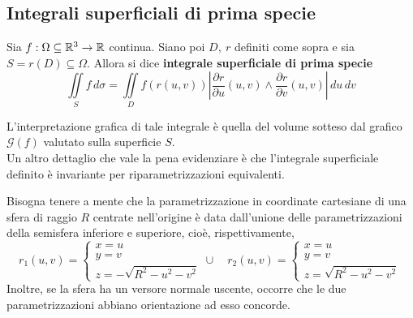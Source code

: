 \subsection{Integrali superficiali di prima specie}
 \begin{definition} \label{Def: Integrale superficiale di prima specie}
     Sia $f: \Omega \subseteq \mathbb{R}^3 \to \mathbb{R}$ continua. Siano poi $D,\ r$ definiti come sopra e sia $S=r(D) \subseteq \Omega$. Allora si dice \textbf{integrale superficiale di prima specie}
     \begin{equation}
         \iint\limits_{S}{f}\, d\sigma = \iint\limits_{D}{f(r(u,v)) \left|\frac{\partial r}{\partial u} (u,v) \wedge \frac{\partial r}{\partial v}(u,v) \right|\, du\, dv}
     \end{equation}
 \end{definition}
 L'interpretazione grafica di tale integrale è quella del volume sotteso dal grafico $\mathcal{G}(f)$ valutato sulla superficie $S$.\\
 Un altro dettaglio che vale la pena evidenziare è che l'integrale superficiale definito è invariante per riparametrizzazioni equivalenti.
 \begin{oss}
     Bisogna tenere a mente che la parametrizzazione in coordinate cartesiane di una sfera di raggio $R$ centrate nell'origine è data dall'unione delle parametrizzazioni della semisfera inferiore e superiore, cioè, rispettivamente,
     \begin{equation}
         r_1(u,v)= \begin{cases}
             x= u\\
             y=v\\
             z=-\sqrt{R^2- u^2-v^2}
         \end{cases}
         \cup  \quad
         r_2(u,v)= \begin{cases}
             x=u\\
             y=v\\
             z=\sqrt{R^2- u^2-v^2}
         \end{cases}
     \end{equation}
     Inoltre, se la sfera ha un versore normale uscente, occorre che le due parametrizzazioni abbiano orientazione ad esso concorde.
 \end{oss}
